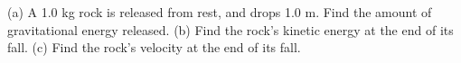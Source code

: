 (a) A 1.0 kg rock is released from rest, and drops 1.0 m. Find the amount of gravitational energy released.\answercheck\hwendpart
(b) Find the rock's kinetic energy at the end of its fall.\answercheck\hwendpart
(c) Find the rock's velocity at the end of its fall.\answercheck\hwendpart
